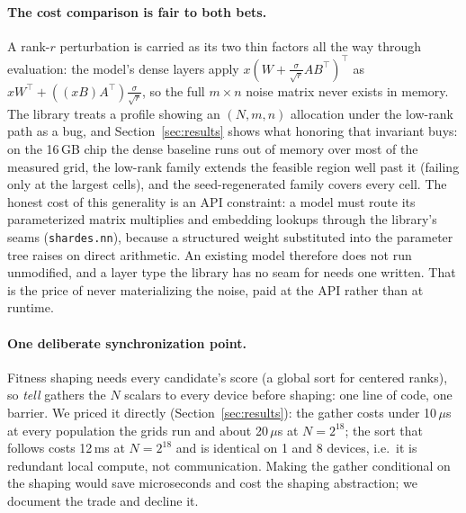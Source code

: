 \paragraph{The cost comparison is fair to both bets.} A rank-$r$ perturbation is
carried as its two thin factors all the way through evaluation: the model's
dense layers apply $x(W + \tfrac{\sigma}{\sqrt r}AB^\top)^\top$ as
$xW^\top + ((xB)A^\top)\tfrac{\sigma}{\sqrt r}$, so the full $m\times n$ noise
matrix never exists in memory. The library treats a profile showing an
$(N, m, n)$ allocation under the low-rank path as a bug, and
Section~\ref{sec:results} shows what honoring that invariant buys: on the
16\,GB chip the dense baseline runs out of memory over most of the
measured grid, the low-rank family extends the feasible region well past
it (failing only at the largest cells), and the seed-regenerated family
covers every cell. The honest cost of this generality is
an API constraint: a model must route its parameterized matrix multiplies
and embedding lookups through the library's seams (\texttt{shardes.nn}),
because a structured weight substituted into the parameter tree raises on
direct arithmetic. An existing model therefore does not run unmodified, and a
layer type the library has no seam for needs one written. That is the price
of never materializing the noise, paid at the API rather than at runtime.

\paragraph{One deliberate synchronization point.} Fitness shaping needs every
candidate's score (a global sort for centered ranks), so \emph{tell} gathers
the $N$ scalars to every device before shaping: one line of code, one
barrier. We priced it directly (Section~\ref{sec:results}): the gather costs
under 10\,$\mu$s at every population the grids run and about 20\,$\mu$s at
$N{=}2^{18}$; the sort that
follows costs 12\,ms at $N{=}2^{18}$ and is identical on 1 and 8 devices,
i.e.\ it is redundant local compute, not communication. Making the gather
conditional on the shaping would save microseconds and cost the shaping
abstraction; we document the trade and decline it.
